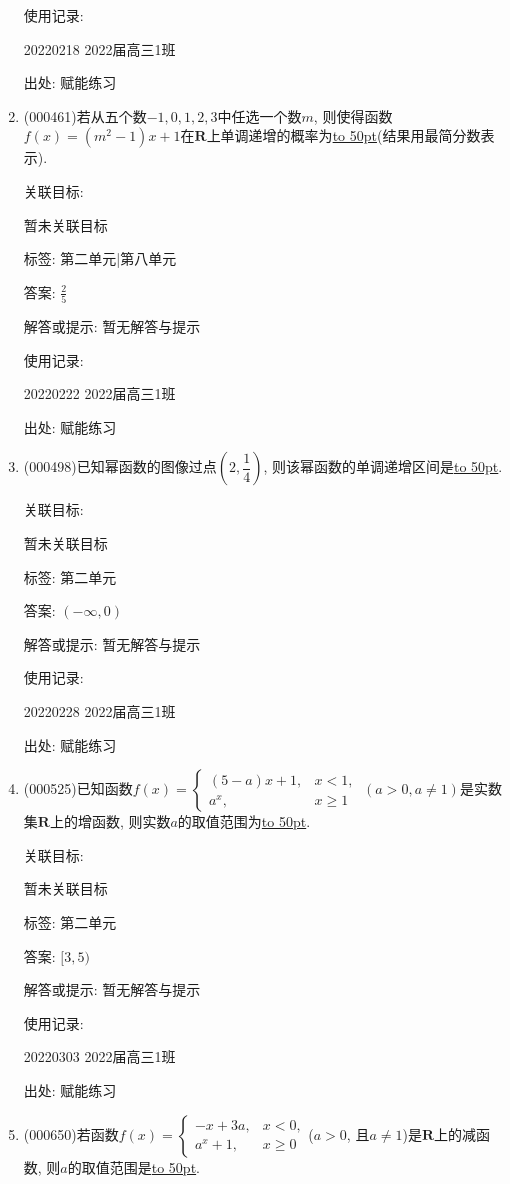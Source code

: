 \documentclass[10pt,a4paper]{article}
\newcommand{\blank}[1]{\underline{\hbox to #1pt{}}}
\begin{document}
\begin{enumerate}[1.]
使用记录:

20220218	2022届高三1班	


出处: 赋能练习
\item { (000461)}若从五个数$-1,0,1,2,3$中任选一个数$m$, 则使得函数$f(x)=(m^2-1)x+1$在$\mathbf{R}$上单调递增的概率为\blank{50}(结果用最简分数表示).


关联目标:

暂未关联目标



标签: 第二单元|第八单元

答案: $\frac 25$

解答或提示: 暂无解答与提示

使用记录:

20220222	2022届高三1班	


出处: 赋能练习
\item { (000498)}已知幂函数的图像过点$(2,\dfrac14)$, 则该幂函数的单调递增区间是\blank{50}.


关联目标:

暂未关联目标



标签: 第二单元

答案: $(-\infty ,0)$

解答或提示: 暂无解答与提示

使用记录:

20220228	2022届高三1班	


出处: 赋能练习
\item { (000525)}已知函数$f(x)=\begin{cases} (5-a)x+1, & x<1, \\ a^x, & x\ge 1\end{cases} \ (a>0,a\ne 1)$是实数集$\mathbf{R}$上的增函数, 则实数$a$的取值范围为\blank{50}.


关联目标:

暂未关联目标



标签: 第二单元

答案: $[3,5)$

解答或提示: 暂无解答与提示

使用记录:

20220303	2022届高三1班	


出处: 赋能练习
\item { (000650)}若函数$f(x)=\begin{cases} -x+3a, & x<0,  \\ a^x+1, & x\ge 0 \end{cases}$($a>0$, 且$a\ne 1$)是$\mathbf{R}$上的减函数, 则$a$的取值范围是\blank{50}.



\end{enumerate}
\end{document}
